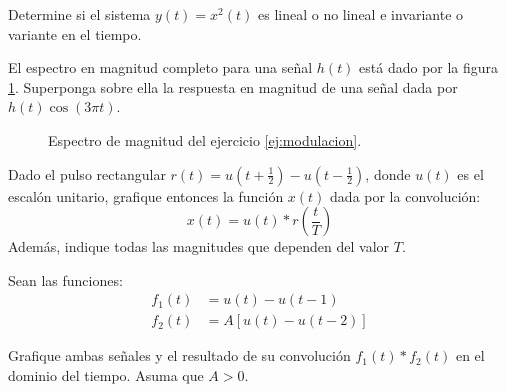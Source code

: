 \begin{ejercicio}
    Determine si el sistema $y(t)=x^2(t)$ es lineal o no lineal e invariante o variante en el tiempo.
\end{ejercicio}

\begin{ejercicio}
    El espectro en magnitud completo para una señal $h(t)$ está dado por la figura \ref{fig:modulacion}. Superponga sobre ella la respuesta en magnitud de una señal dada por $h(t)\cos(3\pi t)$.
    \label{ej:modulacion}
    \begin{figure}[!h]
        \centering
        
        \caption{Espectro de magnitud del ejercicio \ref{ej:modulacion}.}
        \label{fig:modulacion}
    \end{figure}

\end{ejercicio}

\begin{ejercicio}
    Dado el pulso rectangular $r(t)=u(t+\frac{1}{2})-u(t-\frac{1}{2})$, donde $u(t)$ es el escalón unitario, grafique entonces la función $x(t)$ dada por la convolución:
    $$ x(t)=u(t)*r \left(\frac{t}{T} \right) $$
    Además, indique todas las magnitudes que dependen del valor $T$.
\end{ejercicio}

\begin{ejercicio}
    Sean las funciones:
    \begin{align*}
        f_1(t) &= u(t)-u(t-1)\\
        f_2(t) &= A[u(t)-u(t-2)]
    \end{align*}
\end{ejercicio}

Grafique ambas señales y el resultado de su convolución $f_1(t)*f_2(t)$ en el dominio del tiempo. Asuma que $A>0$.

